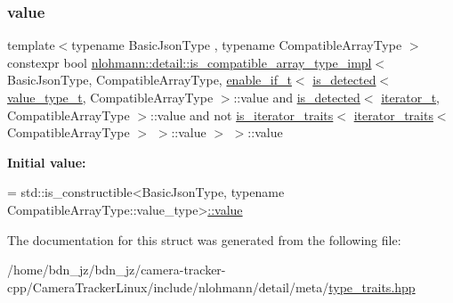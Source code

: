 \subsubsection{\texorpdfstring{value}{value}}
{\footnotesize\ttfamily template$<$typename Basic\+Json\+Type , typename Compatible\+Array\+Type $>$ \\
constexpr bool \hyperlink{structnlohmann_1_1detail_1_1is__compatible__array__type__impl}{nlohmann\+::detail\+::is\+\_\+compatible\+\_\+array\+\_\+type\+\_\+impl}$<$ Basic\+Json\+Type, Compatible\+Array\+Type, \hyperlink{namespacenlohmann_1_1detail_a02bcbc878bee413f25b985ada771aa9c}{enable\+\_\+if\+\_\+t}$<$ \hyperlink{namespacenlohmann_1_1detail_a9135fcf616d6ac6e231a86e0a055ac44}{is\+\_\+detected}$<$ \hyperlink{namespacenlohmann_1_1detail_af91beae90c2fb0f931079b3d50a343bc}{value\+\_\+type\+\_\+t}, Compatible\+Array\+Type $>$\+::value and \hyperlink{namespacenlohmann_1_1detail_a9135fcf616d6ac6e231a86e0a055ac44}{is\+\_\+detected}$<$ \hyperlink{namespacenlohmann_1_1detail_a9ff93db146174305bce1bc4c54703e11}{iterator\+\_\+t}, Compatible\+Array\+Type $>$\+::value and not \hyperlink{structnlohmann_1_1detail_1_1is__iterator__traits}{is\+\_\+iterator\+\_\+traits}$<$ \hyperlink{structnlohmann_1_1detail_1_1iterator__traits}{iterator\+\_\+traits}$<$ Compatible\+Array\+Type $>$ $>$\+::value $>$ $>$\+::value\hspace{0.3cm}{\ttfamily [static]}}

{\bfseries Initial value\+:}
\begin{DoxyCode}
=
        std::is\_constructible<BasicJsonType,
        \textcolor{keyword}{typename} CompatibleArrayType::value\_type>\hyperlink{structnlohmann_1_1detail_1_1is__compatible__array__type__impl_3_01_basic_json_type_00_01_compati04c4671a9fa75002365be1949a74f972_aa9bdf31f85ac3ee17180a008f1cb81f7}{::value}
\end{DoxyCode}


The documentation for this struct was generated from the following file\+:\begin{DoxyCompactItemize}
\item 
/home/bdn\+\_\+jz/bdn\+\_\+jz/camera-\/tracker-\/cpp/\+Camera\+Tracker\+Linux/include/nlohmann/detail/meta/\hyperlink{type__traits_8hpp}{type\+\_\+traits.\+hpp}\end{DoxyCompactItemize}
